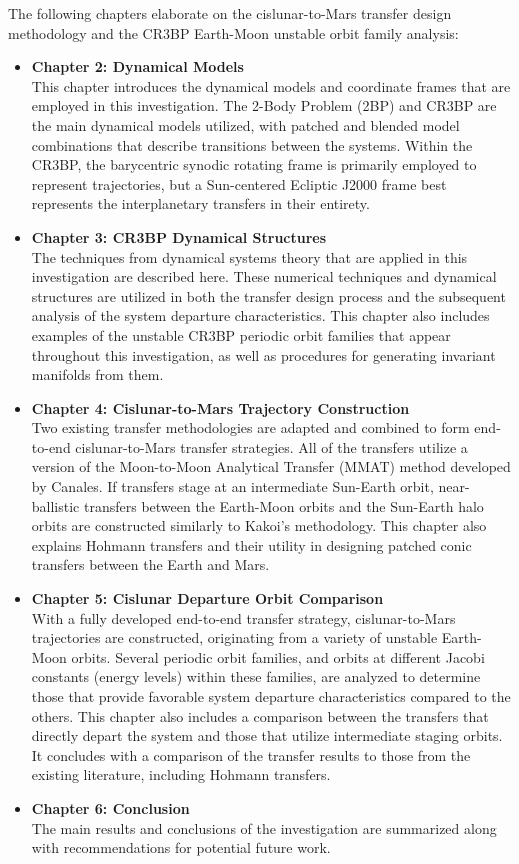 The following chapters elaborate on the cislunar-to-Mars transfer design methodology and the CR3BP
Earth-Moon unstable orbit family analysis:
\begin{itemize}
	\item	\textbf{Chapter 2: Dynamical Models}\\
			This chapter introduces the dynamical models and coordinate frames that are employed in
			this investigation. The 2-Body Problem (2BP) and CR3BP are the main dynamical models
			utilized, with patched and blended model combinations that describe transitions between
			the systems. Within the CR3BP, the barycentric synodic rotating frame is primarily
			employed to represent trajectories, but a Sun-centered Ecliptic J2000 frame best
			represents the interplanetary transfers in their entirety.
	\item	\textbf{Chapter 3: CR3BP Dynamical Structures}\\
			The techniques from dynamical systems theory that are applied in this investigation are
			described here. These numerical techniques and dynamical structures are utilized in
			both the transfer design process and the subsequent analysis of the system departure
			characteristics. This chapter also includes examples of the unstable CR3BP periodic
			orbit families that appear throughout this investigation, as well as procedures for
			generating invariant manifolds from them.
	\item	\textbf{Chapter 4: Cislunar-to-Mars Trajectory Construction}\\
			Two existing transfer methodologies are adapted and combined to form end-to-end
			cislunar-to-Mars transfer strategies. All of the transfers utilize a version of the
			Moon-to-Moon Analytical Transfer (MMAT) method developed by
			Canales\cite{Canales:2021b}. If transfers stage at an intermediate Sun-Earth orbit,
			near-ballistic transfers between the Earth-Moon orbits and the Sun-Earth halo orbits
			are constructed similarly to Kakoi's methodology\cite{Kakoi:2015}. This chapter also
			explains Hohmann transfers and their utility in designing patched conic transfers
			between the Earth and Mars.
	\item	\textbf{Chapter 5: Cislunar Departure Orbit Comparison}\\
			With a fully developed end-to-end transfer strategy, cislunar-to-Mars trajectories are
			constructed, originating from a variety of unstable Earth-Moon orbits. Several periodic
			orbit families, and orbits at different Jacobi constants (energy levels) within these
			families, are analyzed to determine those that provide favorable system departure
			characteristics compared to the others. This chapter also includes a comparison between
			the transfers that directly depart the system and those that utilize intermediate
			staging orbits. It concludes with a comparison of the transfer results to those from
			the existing literature, including Hohmann transfers.
	\item	\textbf{Chapter 6: Conclusion}\\
			The main results and conclusions of the investigation are summarized along with
			recommendations for potential future work.
\end{itemize}
